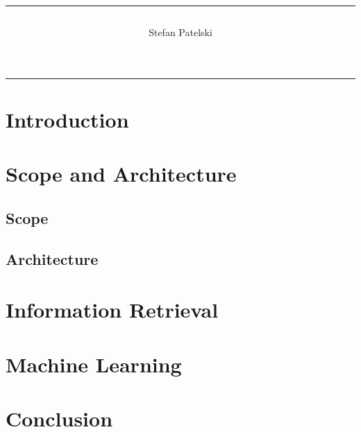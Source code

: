 \documentclass[a4paper,twoside,11pt]{article}
\title{\rule{\linewidth}{.75pt} \center{Title goes here}}
\author{Stefan Patelski}
\begin{document}
\maketitle
\vspace{-2\baselineskip}

\bigskip
\noindent\rule[2.5pt]{\textwidth}{0.75pt}

\newpage
\tableofcontents
\newpage

\section{Introduction}

\section{Scope and Architecture}
\subsection{Scope}

\subsection{Architecture}


\section{Information Retrieval}



\section{Machine Learning}

\section{Conclusion}

\end{document}
